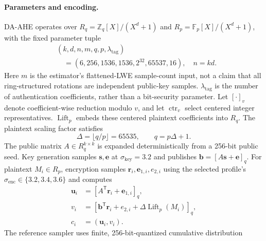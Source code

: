 
\paragraph{Parameters and encoding.}
DA-AHE operates over $R_q=\mathbb{Z}_q[X]/(X^d+1)$ and
$R_p=\mathbb{F}_p[X]/(X^d+1)$, with the fixed parameter tuple
\begin{equation}
 \begin{aligned}
 &(k,d,n,m,q,p,\lambda_{\mathrm{tag}})\\
 &\quad=(6,256,1536,1536,2^{32},65537,16),\quad n=kd.
 \end{aligned}
 \label{eq:daahe_protocol_parameters}
\end{equation}
Here $m$ is the estimator's flattened-LWE sample-count input, not a claim that
all ring-structured rotations are independent public-key samples.
$\lambda_{\mathrm{tag}}$ is the number of authentication coefficients, rather
than a bit-security parameter.
Let $[\cdot]_v$ denote coefficient-wise reduction modulo $v$, and let
$\operatorname{ctr}_v$ select centered integer representatives.
$\operatorname{Lift}_p$ embeds these centered plaintext coefficients into $R_q$.
The plaintext
scaling factor satisfies
\begin{equation}
 \Delta=\lfloor q/p\rfloor=65535,\qquad q=p\Delta+1.
 \label{eq:daahe_protocol_scaling}
\end{equation}
The public matrix $A\in R_q^{k\times k}$ is expanded deterministically from a
256-bit public seed. Key generation samples $\boldsymbol{s},\boldsymbol{e}$
at $\sigma_{\mathrm{key}}=3.2$ and publishes
$\boldsymbol{b}=[A\boldsymbol{s}+\boldsymbol{e}]_q$. For plaintext
$M_i\in R_p$, encryption samples
$\boldsymbol{r}_i,\boldsymbol{e}_{1,i},e_{2,i}$ using the selected profile's
$\sigma_{\mathrm{enc}}\in\{3.2,3.4,3.6\}$ and computes
\begin{equation}
 \begin{aligned}
  \boldsymbol{u}_i&=[A^{\mathsf T}\boldsymbol{r}_i+
                       \boldsymbol{e}_{1,i}]_q,\\
  v_i&=[\boldsymbol{b}^{\mathsf T}\boldsymbol{r}_i+e_{2,i}
             +\Delta\operatorname{Lift}_p(M_i)]_q,\\
  c_i&=(\boldsymbol{u}_i,v_i).
 \end{aligned}
 \label{eq:daahe_protocol_encryption}
\end{equation}
The reference sampler uses finite, 256-bit-quantized cumulative distribution

